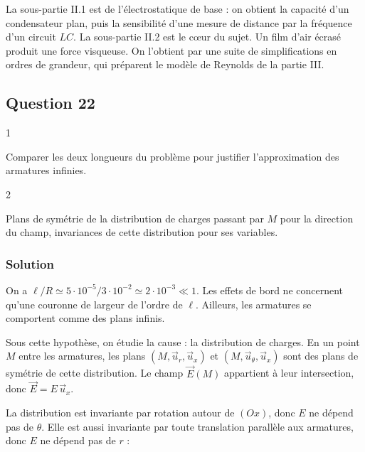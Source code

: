 \documentclass[11pt,a4paper]{article}
\newcommand{\equationajustee}[1]{%
  \sbox{\boiteequation}{$\displaystyle #1$}%
  \ifdim\wd\boiteequation>\linewidth
    \[\resizebox{\linewidth}{!}{\usebox{\boiteequation}}\]%
  \else
    \[#1\]%
  \fi}
\begin{document}
La sous-partie II.1 est de l'électrostatique de base : on obtient la capacité d'un condensateur plan, puis la sensibilité d'une mesure de distance par la fréquence d'un circuit \(LC\). La sous-partie II.2 est le cœur du sujet. Un film d'air écrasé produit une force visqueuse. On l'obtient par une suite de simplifications en ordres de grandeur, qui préparent le modèle de Reynolds de la partie III.

\hypertarget{question-22}{%
\subsection{Question 22}\label{question-22}}

\begin{indication}{1}

Comparer les deux longueurs du problème pour justifier l'approximation des armatures infinies.

\end{indication}

\begin{indication}{2}

Plans de symétrie de la distribution de charges passant par \(M\) pour la direction du champ, invariances de cette distribution pour ses variables.

\end{indication}

\hypertarget{solution-21}{%
\subsubsection{Solution}\label{solution-21}}

On a \(\ell/R\simeq5\cdot10^{-5}/3\cdot10^{-2}\simeq2\cdot10^{-3}\ll1\). Les effets de bord ne concernent qu'une couronne de largeur de l'ordre de \(\ell\). Ailleurs, les armatures se comportent comme des plans infinis.

Sous cette hypothèse, on étudie la cause : la distribution de charges. En un point \(M\) entre les armatures, les plans \((M,\vec u_r,\vec u_x)\) et \((M,\vec u_\theta,\vec u_x)\) sont des plans de symétrie de cette distribution. Le champ \(\vec E(M)\) appartient à leur intersection, donc \(\vec E=E\,\vec u_x\).

La distribution est invariante par rotation autour de \((Ox)\), donc \(E\) ne dépend pas de \(\theta\). Elle est aussi invariante par toute translation parallèle aux armatures, donc \(E\) ne dépend pas de \(r\) :
\equationajustee{\boxed{\vec E=E(x)\,\vec u_x}}
\end{document}

